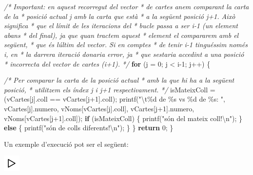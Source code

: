 \documentclass[
]{book}
\newenvironment{Shaded}{\begin{snugshade}}{\end{snugshade}}
\newcommand{\CommentTok}[1]{\textcolor[rgb]{0.56,0.35,0.01}{\textit{#1}}}
\newcommand{\ControlFlowTok}[1]{\textcolor[rgb]{0.13,0.29,0.53}{\textbf{#1}}}
\newcommand{\DecValTok}[1]{\textcolor[rgb]{0.00,0.00,0.81}{#1}}
\newcommand{\NormalTok}[1]{#1}
\newcommand{\SpecialCharTok}[1]{\textcolor[rgb]{0.00,0.00,0.00}{#1}}
\newcommand{\StringTok}[1]{\textcolor[rgb]{0.31,0.60,0.02}{#1}}
\begin{document}
\begin{Shaded}
\begin{Highlighting}[]
    \CommentTok{/* Important: en aquest recorregut del vector}
\CommentTok{     * de cartes anem comparant la carta de la }
\CommentTok{     * posició actual j amb la carta que està}
\CommentTok{     * a la següent posició j+1. Això significa}
\CommentTok{     * que el límit de les iteracions del }
\CommentTok{     * bucle passa a ser i{-}1 (un element abans}
\CommentTok{     * del final), ja que quan tractem aquest}
\CommentTok{     * element el compararem amb el següent,}
\CommentTok{     * que és l\textquotesingle{}últim del vector. Si en comptes}
\CommentTok{     * de tenir i{-}1 tinguéssim només i, en }
\CommentTok{     * la darrera iteració donaria error, ja }
\CommentTok{     * que s\textquotesingle{}estaria accedint a una posició}
\CommentTok{     * incorrecta del vector de cartes (i+1).}
\CommentTok{     */}
    \ControlFlowTok{for}\NormalTok{ (j = }\DecValTok{0}\NormalTok{; j \textless{} i{-}}\DecValTok{1}\NormalTok{; j++) \{}
        
        \CommentTok{/* Per comparar la carta de la posició actual}
\CommentTok{         * amb la que hi ha a la següent posició,}
\CommentTok{         * utilitzem els índex j i j+1 respectivament.}
\CommentTok{         */}
\NormalTok{        isMateixColl = (vCartes[j].coll == vCartes[j+}\DecValTok{1}\NormalTok{].coll);}
\NormalTok{        printf(}\StringTok{"}\SpecialCharTok{\textbackslash{}t}\StringTok{\%d de \%s vs \%d de \%s: "}\NormalTok{, vCartes[j].numero, vNoms[vCartes[j].coll], vCartes[j+}\DecValTok{1}\NormalTok{].numero, vNoms[vCartes[j+}\DecValTok{1}\NormalTok{].coll]);}
        \ControlFlowTok{if}\NormalTok{ (isMateixColl) \{}
\NormalTok{            printf(}\StringTok{"són del mateix coll!}\SpecialCharTok{\textbackslash{}n}\StringTok{"}\NormalTok{);}
\NormalTok{        \} }\ControlFlowTok{else}\NormalTok{ \{}
\NormalTok{            printf(}\StringTok{"són de colls diferents!}\SpecialCharTok{\textbackslash{}n}\StringTok{"}\NormalTok{);}
\NormalTok{        \}}
\NormalTok{    \}}
    \ControlFlowTok{return} \DecValTok{0}\NormalTok{;}
\NormalTok{\}}
\end{Highlighting}
\end{Shaded}

Un exemple d'execució pot ser el següent:

\includegraphics{./img/play.png}
\end{document}
